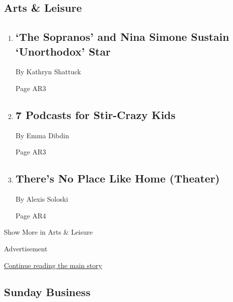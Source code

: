 \hypertarget{arts--leisure}{%
\subsection{Arts \& Leisure}\label{arts--leisure}}

\begin{enumerate}
\def\labelenumi{\arabic{enumi}.}
\item
  \href{/2020/04/14/arts/television/shira-haas-unorthodox.html}{}

  \hypertarget{the-sopranos-and-nina-simone-sustain-unorthodox-star}{%
  \subsection{`The Sopranos' and Nina Simone Sustain `Unorthodox'
  Star}\label{the-sopranos-and-nina-simone-sustain-unorthodox-star}}

  By Kathryn Shattuck

  Page AR3
\item
  \href{/2020/04/15/arts/podcasts-children-coronavirus.html}{}

  \hypertarget{7-podcasts-for-stir-crazy-kids}{%
  \subsection{7 Podcasts for Stir-Crazy
  Kids}\label{7-podcasts-for-stir-crazy-kids}}

  By Emma Dibdin

  Page AR3
\item
  \href{/2020/04/16/theater/immersive-home-virus.html}{}

  \hypertarget{theres-no-place-like-home-theater}{%
  \subsection{There's No Place Like Home
  (Theater)}\label{theres-no-place-like-home-theater}}

  By Alexis Soloski

  Page AR4
\end{enumerate}

Show More in Arts \& Leisure

Advertisement

\protect\hyperlink{after-mid4}{Continue reading the main story}

\hypertarget{sunday-business}{%
\subsection{Sunday Business}\label{sunday-business}}


